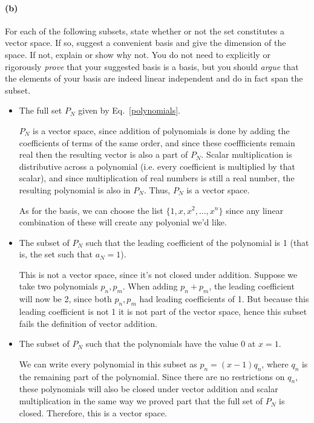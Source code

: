 \documentclass{article}
\begin{document}
\paragraph{(b)}
For each of the following subsets, state whether or not the set constitutes a vector space.  If so, suggest a convenient basis and give the dimension of the space.  
If not, explain or show why not.  You do not need to explicitly or rigorously \emph{prove} that your suggested basis is a basis, but you should \emph{argue}
that the elements of your basis are indeed linear independent and do in fact span the subset.
	\begin{itemize}
		\item The full set $P_{N}$ given by Eq.~\ref{polynomials}.

  \begin{solution}
      $P_N$ is a vector space, since addition of polynomials is done by adding the coefficients of terms of the same order, and since these coeffficients remain real then the resulting vector is also a part of $P_N$. Scalar multiplication is distributive across a polynomial (i.e. every coefficient is multiplied by that scalar), and since multiplication of real numbers is still a real number, the resulting polynomial is also in $P_N$. Thus, $P_N$ is a vector space.

      As for the basis, we can choose the list $\{1, x, x^2, \dots, x^n\}$ since any linear combination of these will create any polyonial we'd like.
  \end{solution}
		\item The subset of $P_{N}$ such that the leading coefficient of the polynomial is 1 (that is, the set such that $a_{N} = 1$).
  \begin{solution}
      This is not a vector space, since it's not closed under addition. Suppose we take two polynomials $p_n, p_m$. When adding $p_n + p_m$, the leading coefficient will now be 2, since both $p_n, p_m$ had leading coefficients of 1. But because this leading coefficient is not 1 it is not part of the vector space, hence this subset fails the definition of vector addition.
  \end{solution}
		\item The subset of $P_{N}$ such that the polynomials have the value 0 at $x=1$.

  \begin{solution}
      We can write every polynomial in this subset as $p_n = (x - 1) q_n$, where $q_n$ is the remaining part of the polynomial. Since there are no restrictions on $q_n$, these polynomials will also be closed under vector addition and scalar multiplication in the same way we proved part that the full set of $P_N$ is closed. Therefore, this is a vector space. 
	  

\end{solution}
\end{itemize}
\end{document}

